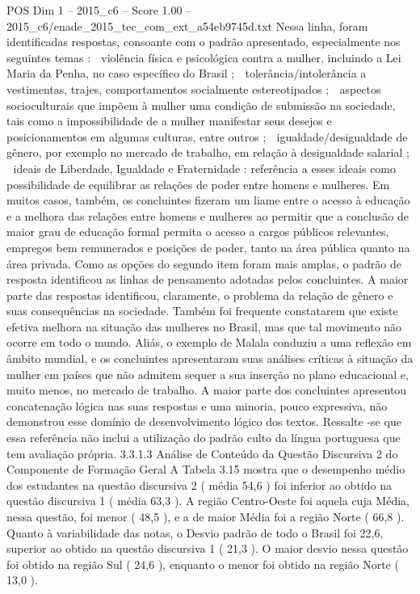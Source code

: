 \begin{textsample}{POS Dim 1 – 2015\_c6 – Score 1.00 – 2015\_c6/enade\_2015\_tec\_com\_ext\_a54eb9745d.txt}
Nessa linha, foram identificadas respostas, consoante com o padrão apresentado, especialmente nos seguintes temas :  violência física e psicológica contra a mulher, incluindo a Lei Maria da Penha, no caso específico do Brasil ;  tolerância/intolerância a vestimentas, trajes, comportamentos socialmente estereotipados ;  aspectos socioculturais que impõem à mulher uma condição de submissão na sociedade, tais como a impossibilidade de a mulher manifestar seus desejos e posicionamentos em algumas culturas, entre outros ;  igualdade/desigualdade de gênero, por exemplo no mercado de trabalho, em relação à desigualdade salarial ;  ideais de Liberdade, Igualdade e Fraternidade : referência a esses ideais como possibilidade de equilibrar as relações de poder entre homens e mulheres.
Em muitos casos, também, os concluintes fizeram um liame entre o acesso à educação e a melhora das relações entre homens e mulheres ao permitir que a conclusão de maior grau de educação formal permita o acesso a cargos públicos relevantes, empregos bem remunerados e posições de poder, tanto na área pública quanto na área privada.
Como as opções do segundo item foram mais amplas, o padrão de resposta identificou as linhas de pensamento adotadas pelos concluintes.
A maior parte das respostas identificou, claramente, o problema da relação de gênero e suas consequências na sociedade.
Também foi frequente constatarem que existe efetiva melhora na situação das mulheres no Brasil, mas que tal movimento não ocorre em todo o mundo.
Aliás, o exemplo de Malala conduziu a uma reflexão em âmbito mundial, e os concluintes apresentaram suas análises críticas à situação da mulher em países que não admitem sequer a sua inserção no plano educacional e, muito menos, no mercado de trabalho.
A maior parte dos concluintes apresentou concatenação lógica nas suas respostas e uma minoria, pouco expressiva, não demonstrou esse domínio de desenvolvimento lógico dos textos.
Ressalte -se que essa referência não inclui a utilização do padrão culto da língua portuguesa que tem avaliação própria. 3.3.1.3 Análise de Conteúdo da Questão Discursiva 2 do Componente de Formação Geral A Tabela 3.15 mostra que o desempenho médio dos estudantes na questão discursiva 2 ( média 54,6 ) foi inferior ao obtido na questão discursiva 1 ( média 63,3 ).
A região Centro-Oeste foi aquela cuja Média, nessa questão, foi menor ( 48,5 ), e a de maior Média foi a região Norte ( 66,8 ).
Quanto à variabilidade das notas, o Desvio padrão de todo o Brasil foi 22,6, superior ao obtido na questão discursiva 1 ( 21,3 ).
O maior desvio nessa questão foi obtido na região Sul ( 24,6 ), enquanto o menor foi obtido na região Norte ( 13,0 ).

\end{textsample}
